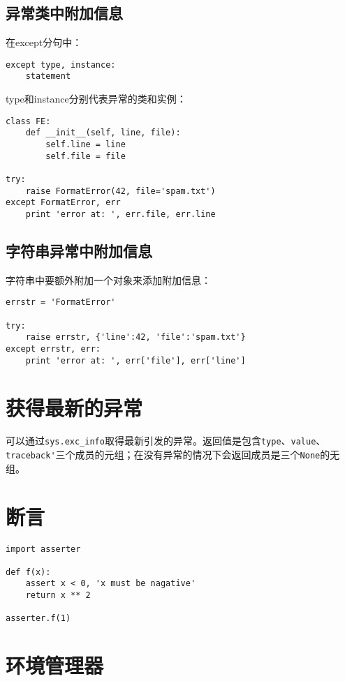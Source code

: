 \subsection{异常类中附加信息}

在except分句中：

\begin{lstlisting}
except type, instance:
	statement
\end{lstlisting}

type和instance分别代表异常的类和实例：

\begin{lstlisting}
class FE:
	def __init__(self, line, file):
		self.line = line
		self.file = file

try:
	raise FormatError(42, file='spam.txt')
except FormatError, err
	print 'error at: ', err.file, err.line
\end{lstlisting}

\subsection{字符串异常中附加信息}

字符串中要额外附加一个对象来添加附加信息：

\begin{lstlisting}
errstr = 'FormatError'

try:
	raise errstr, {'line':42, 'file':'spam.txt'}
except errstr, err:
	print 'error at: ', err['file'], err['line']
\end{lstlisting}

\section{获得最新的异常}

可以通过\verb|sys.exc_info|取得最新引发的异常。返回值是包含\verb|type|、\verb|value|、\verb|traceback'|三个成员的元组；在没有异常的情况下会返回成员是三个\verb|None|的无组。


\section{断言}

\begin{lstlisting}
import asserter

def f(x):
	assert x < 0, 'x must be nagative'
	return x ** 2

asserter.f(1)
\end{lstlisting}

\section{环境管理器}


